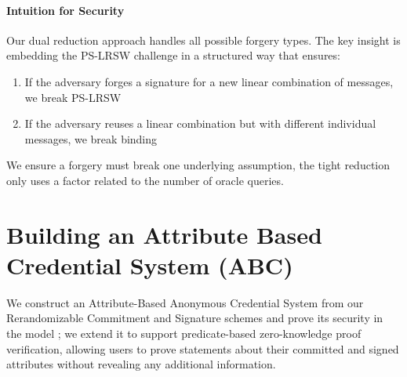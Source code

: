 \paragraph{Intuition for Security}
Our dual reduction approach handles all possible forgery types. The key insight is embedding the PS-LRSW challenge in a structured way that ensures:
\begin{enumerate}
    \item If the adversary forges a signature for a new linear combination of messages, we break PS-LRSW
    \item If the adversary reuses a linear combination but with different individual messages, we break binding
\end{enumerate}
We ensure a forgery must break one underlying assumption, the tight reduction only uses a factor related to the number of oracle queries. 
















































\newpage
\section{Building an Attribute Based Credential System (ABC)}\label{sec:abc}

We construct an Attribute-Based Anonymous Credential System from our Rerandomizable Commitment and Signature schemes and prove its security in the model \cite{fuchsbauer_structure-preserving_2019}; we extend it to support predicate-based zero-knowledge proof verification, allowing users to prove statements about their committed and signed attributes without revealing any additional information.


